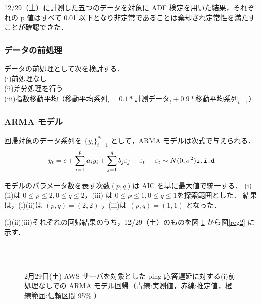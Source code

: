 \documentclass[a4j]{jarticle}
\begin{document}
12/29（土）に計測した五つのデータを対象に ADF 検定を用いた結果，それぞれの p 値はすべて 0.01 以下となり非定常であることは棄却され定常性を満たすことが確認できた．

\subsubsection{データの前処理}
データの前処理として次を検討する．\\
(i)前処理なし\\
(ii)差分処理を行う\\
(iii)指数移動平均（$移動平均系列_t = 0.1*計測データ_t + 0.9*移動平均系列_{t-1}$）
\subsubsection{ARMA モデル}
回帰対象のデータ系列を $\{y_t\}^N_{t=1}$ として，ARMA モデルは次式で与えられる．
$$\displaystyle y_t = c + \sum^p_{i=1}a_iy_i + \sum^q_{j=1}b_j\varepsilon_j + \varepsilon_t \hspace{0.5cm} \varepsilon_t \sim N(0,\sigma^2) \verb|i.i.d|$$

モデルのパラメータ数を表す次数$ (p,q) $は AIC を基に最大値で統一する．
(i)(ii)は $0 \le p \le 2 , 0 \le q \le 2$，(iii) は $0 \le p \le 1 , 0 \le q \le 1$を探索範囲とした．
結果は，(i)(ii)は $(p,q)=(2,2)$ ，(iii)は $(p,q)=(1,1)$ となった．

(i)(ii)(iii)それぞれの回帰結果のうち，12/29（土）のものを図 \ref{reg1} から図\ref{reg2} に示す．
\begin{figure}[H]
\begin{center}
~
~
\\
~
\caption{2月29日(土) AWS サーバを対象とした ping 応答遅延に対する(i)前処理なしでの ARMA モデル回帰（青線:実測値，赤線:推定値，橙線範囲:信頼区間 95\% ）}
\label{reg1}
\end{center}
\end{figure}
\end{document}

